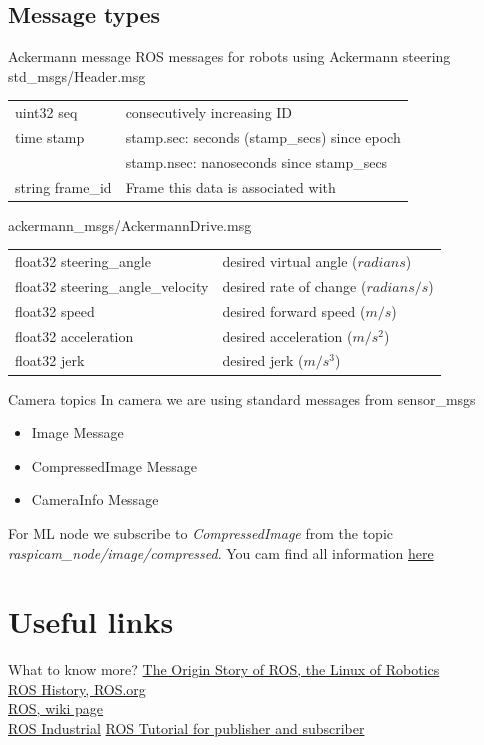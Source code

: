 \documentclass{beamer}
\begin{document}
\subsection{Message types}
\begin{frame}{Ackermann message}
ROS messages for robots using Ackermann steering
\vfill
std\_msgs/Header.msg\\
\begin{tabular}{l|l}
uint32 seq & consecutively increasing ID\\
time stamp & stamp.sec: seconds (stamp\_secs) since epoch\\
           & stamp.nsec: nanoseconds since stamp\_secs\\
string frame\_id & Frame this data is associated with\\
\end{tabular}
\vfill
ackermann\_msgs/AckermannDrive.msg\\
\begin{tabular}{l|l}
float32 steering\_angle & desired virtual angle ($radians$)\\
float32 steering\_angle\_velocity & desired rate of change ($radians/s$)\\
float32 speed & desired forward speed ($m/s$)\\
float32 acceleration & desired acceleration ($m/s^2$)\\
float32 jerk & desired jerk ($m/s^3$)\\
\end{tabular}
\end{frame}

\begin{frame}{Camera topics}
In camera we are using standard messages from sensor\_msgs
\begin{itemize}
\item Image Message
\item CompressedImage Message
\item CameraInfo Message
\end{itemize}
\vfill
For ML node we subscribe to \textit{CompressedImage} from the topic \textit{raspicam\_node/image/compressed}.
\vfill
You cam find all information \href{https://wiki.ros.org/sensor\_msgs}{here}
\end{frame}

\section{Useful links}

\begin{frame}{What to know more?}
\href{https://spectrum.ieee.org/automaton/robotics/robotics-software/the-origin-story-of-ros-the-linux-of-robotics}{The Origin Story of ROS, the Linux of Robotics}\\
\href{https://www.ros.org/history/}{ROS History, ROS.org}\\
\href{https://en.wikipedia.org/wiki/Robot_Operating_System}{ROS, wiki page}\\
\href{http://wiki.ros.org/Industrial/Tutorials}{ROS Industrial}
\href{https://wiki.ros.org/ROS/Tutorials/WritingPublisherSubscriber\%28python\%29}{ROS Tutorial for publisher and subscriber}
\end{frame}
\end{document}
